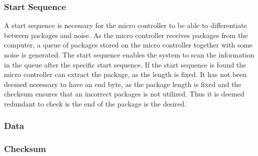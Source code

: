 \subsubsection{Start Sequence}
A start sequence is necessary for the micro controller to be able to differentiate between packages and noise. As the micro controller receives packages from the computer, a queue of packages stored on the micro controller together with some noise is generated. The start sequence enables the system to scan the information in the queue after the specific start sequence. If the start sequence is found the micro controller can extract the package, as the length is fixed. It has not been deemed necessary to have an end byte, as the package length is fixed and the checksum ensures that an incorrect packages is not utilized. Thus it is deemed redundant to check is the end of the package is the desired.

\subsubsection{Data}










\subsubsection{Checksum}







